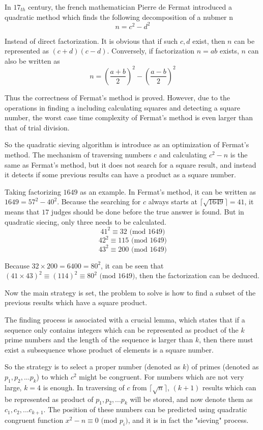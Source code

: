 \documentclass{article}
\begin{document}
In $17_{th}$ century, the french mathematician Pierre de Fermat introduced a quadratic method which finds the following decomposition of a nubmer n $$n = c^2-d^2$$

Instead of direct factorization. It is obvious that if such $c,d$ exist, then $n$ can be represented as $(c+d)(c-d)$. Conversely, if factorization $n=ab$ exists, $n$ can also be written as $$n = (\frac{a+b}{2})^2-(\frac{a-b}{2})^2$$

Thus the correctness of Fermat's method is proved. However, due to the operations in finding a including calculating squares and detecting a square number, the worst case time complexity of Fermat's method is even larger than that of trial division. 

So the quadratic sieving algorithm is introduce as an optimization of Fermat's method. The mechanism of traversing numbers $c$ and calculating $c^2-n$ is the same as Fermat's method, but it does not search for a square result, and instead it detects if some previous results can have a product as a square number.

Taking factorizing $1649$ as an example. In Fermat's method, it can be written as $1649 = 57^2-40^2$. Because the searching for $c$ always starts at $\lceil \sqrt{1649} \rceil = 41$, it means that $17$ judges should be done before the true answer is found. But in quadratic siecing, only three needs to be calculated.$$41^2 \equiv 32 \text{ (mod 1649)}$$$$42^2 \equiv 115 \text{ (mod 1649)}$$$$43^2 \equiv 200 \text{ (mod 1649)}$$

Because $32\times 200 = 6400 = 80^2$, it can be seen that $(41\times 43)^2 \equiv (114)^2 \equiv  80^2 \text{ (mod 1649)}$, then the factorization can be deduced.

Now the main strategy is set, the problem to solve is how to find a subset of the previous results which have a square product.

The finding process is associated with a crucial lemma, which states that if a sequence only contains integers which can be represented as product of the $k$ prime numbers and the length of the sequence is larger than $k$, then there must exist a subsequence whose product of elements is a square number.

So the strategy is to select a proper number (denoted as $k$) of primes (denoted as $p_1,p_2,...p_k$) to which $c^2$ might be congruent. For numbers which are not very large, $k=4$ is enough. In traversing of $c$ from $\lceil \sqrt{n} \rceil$, $(k+1)$ results which can be represented as product of $p_1,p_2,...p_k$ will be stored, and now denote them as $c_1,c_2,...c_{k+1}$. The position of these numbers can be predicted using quadratic congruent function $x^2-n\equiv 0 \text{ (mod $p_i$)}$, and it is in fact the "sieving" process.
\end{document}
